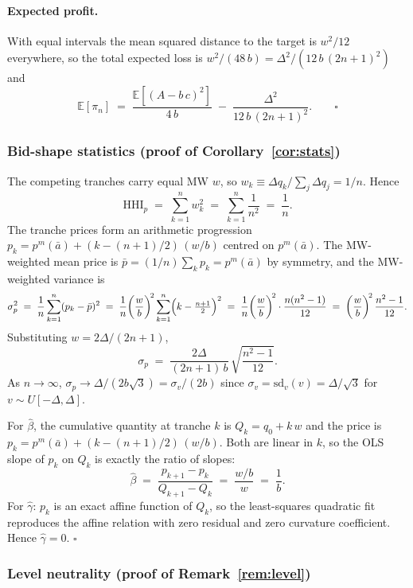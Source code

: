 \documentclass[11pt,a4paper]{article}
\theoremstyle{definition}
\theoremstyle{remark}
\theoremstyle{plain}
\begin{document}
\paragraph{Expected profit.} With equal intervals the mean squared distance to the target is $w^2/12$ everywhere, so the total expected loss is $w^2/(48\, b) = \Delta^2/(12\,b\,(2n+1)^2)$ and
\[
\mathbb{E}[\pi_n] \;=\; \frac{\mathbb{E}[(A - b\,c)^2]}{4\,b} \;-\; \frac{\Delta^2}{12\,b\,(2n+1)^2}. \qquad \square
\]

\subsubsection{Bid-shape statistics (proof of Corollary~\ref{cor:stats})}\label{sec:tranche-app:stats}

The competing tranches carry equal MW $w$, so $w_k \equiv \Delta q_k / \sum_j \Delta q_j = 1/n$. Hence
\[
\text{HHI}_p \;=\; \sum_{k=1}^n w_k^2 \;=\; \sum_{k=1}^n \frac{1}{n^2} \;=\; \frac{1}{n}.
\]
The tranche prices form an arithmetic progression $p_k = p^m(\bar a) + (k - (n+1)/2)\,(w/b)$ centred on $p^m(\bar a)$. The MW-weighted mean price is $\bar p = (1/n)\sum_k p_k = p^m(\bar a)$ by symmetry, and the MW-weighted variance is
\[
\sigma_p^2 \;=\; \frac{1}{n}\sum_{k=1}^n (p_k - \bar p)^2 \;=\; \frac{1}{n}\bigg(\frac{w}{b}\bigg)^{\!2}\sum_{k=1}^n \Bigl(k - \tfrac{n+1}{2}\Bigr)^2 \;=\; \frac{1}{n}\bigg(\frac{w}{b}\bigg)^{\!2} \cdot \frac{n(n^2-1)}{12} \;=\; \bigg(\frac{w}{b}\bigg)^{\!2}\,\frac{n^2-1}{12}.
\]
Substituting $w = 2\Delta/(2n+1)$,
\[
\sigma_p \;=\; \frac{2\Delta}{(2n+1)\,b}\,\sqrt{\frac{n^2-1}{12}}.
\]
As $n \to \infty$, $\sigma_p \to \Delta/(2 b\sqrt{3}) = \sigma_v/(2 b)$ since $\sigma_v = \mathrm{sd}_v(v) = \Delta/\sqrt{3}$ for $v \sim U[-\Delta, \Delta]$.

For $\hat\beta$, the cumulative quantity at tranche $k$ is $Q_k = q_0 + k\,w$ and the price is $p_k = p^m(\bar a) + (k - (n+1)/2)\,(w/b)$. Both are linear in $k$, so the OLS slope of $p_k$ on $Q_k$ is exactly the ratio of slopes:
\[
\hat\beta \;=\; \frac{p_{k+1} - p_k}{Q_{k+1} - Q_k} \;=\; \frac{w/b}{w} \;=\; \frac{1}{b}.
\]
For $\hat\gamma$: $p_k$ is an exact affine function of $Q_k$, so the least-squares quadratic fit reproduces the affine relation with zero residual and zero curvature coefficient. Hence $\hat\gamma = 0$. $\square$

\subsubsection{Level neutrality (proof of Remark~\ref{rem:level})}\label{sec:tranche-app:level}
\end{document}
